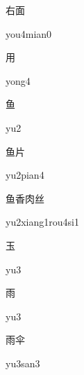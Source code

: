 \begin{multicols*}{2}
\begin{verbete}{右面}
\begin{pronuncia}{you4mian0}
\end{pronuncia}
\end{verbete}

\begin{verbete}[yong4]{用}
\begin{pronuncia}{yong4}
\end{pronuncia}
\end{verbete}

\begin{verbete}[yu2]{鱼}
\begin{pronuncia}{yu2}
\end{pronuncia}
\end{verbete}

\begin{verbete}[yu2pian4]{鱼片}
\begin{pronuncia}{yu2pian4}
\end{pronuncia}
\end{verbete}

\begin{verbete}{鱼香肉丝}
\begin{pronuncia}{yu2xiang1rou4si1}
\end{pronuncia}
\end{verbete}

\begin{verbete}[yu3]{玉}
\begin{pronuncia}{yu3}
\end{pronuncia}
\end{verbete}

\begin{verbete}[yu3]{雨}
\begin{pronuncia}{yu3}
\end{pronuncia}
\end{verbete}

\begin{verbete}[yu3san3]{雨伞}
\begin{pronuncia}{yu3san3}
\end{pronuncia}
\end{verbete}


\end{multicols*}
